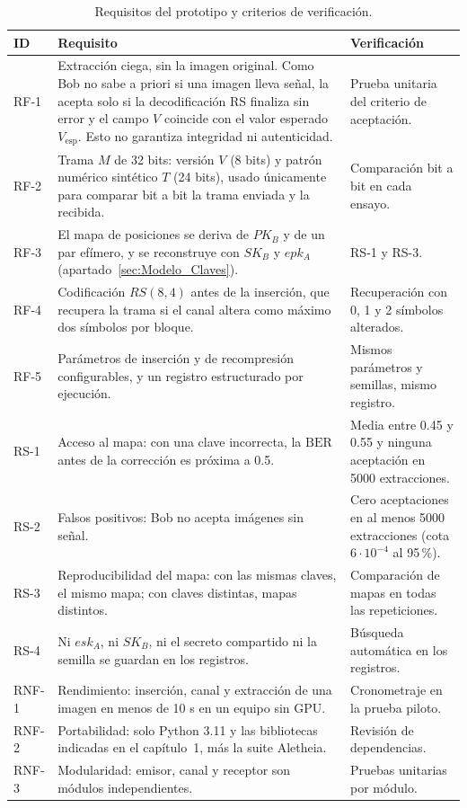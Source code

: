 \documentclass[IB]{TFUOC}%
\begin{document}
\begin{table}[H]
\centering
\scriptsize
\caption{Requisitos del prototipo y criterios de verificación.}
\label{tab:requisitos}
\begin{tabular}{|p{1.1cm}|p{7.2cm}|p{6.2cm}|}
\hline
\rowcolor{uocnavy}
\color{white}\textbf{ID} &
\color{white}\textbf{Requisito} &
\color{white}\textbf{Verificación} \\
\hline
RF-1 & Extracción ciega, sin la imagen original. Como Bob no sabe a priori si una imagen lleva señal, la acepta solo si la decodificación RS finaliza sin error y el campo $V$ coincide con el valor esperado $V_{\mathrm{esp}}$. Esto no garantiza integridad ni autenticidad. & Prueba unitaria del criterio de aceptación. \\
\hline
RF-2 & Trama $M$ de 32 bits: versión $V$ (8 bits) y patrón numérico sintético $T$ (24 bits), usado únicamente para comparar bit a bit la trama enviada y la recibida. & Comparación bit a bit en cada ensayo. \\
\hline
RF-3 & El mapa de posiciones se deriva de $PK_B$ y de un par efímero, y se reconstruye con $SK_B$ y $epk_A$ (apartado~\ref{sec:Modelo_Claves}). & RS-1 y RS-3. \\
\hline
RF-4 & Codificación $RS(8,4)$ antes de la inserción, que recupera la trama si el canal altera como máximo dos símbolos por bloque. & Recuperación con 0, 1 y 2 símbolos alterados. \\
\hline
RF-5 & Parámetros de inserción y de recompresión configurables, y un registro estructurado por ejecución. & Mismos parámetros y semillas, mismo registro. \\
\hline
RS-1 & Acceso al mapa: con una clave incorrecta, la $\mathrm{BER}$ antes de la corrección es próxima a 0.5. & Media entre 0.45 y 0.55 y ninguna aceptación en 5000 extracciones. \\
\hline
RS-2 & Falsos positivos: Bob no acepta imágenes sin señal. & Cero aceptaciones en al menos 5000 extracciones (cota $6\cdot10^{-4}$ al 95\,\%). \\
\hline
RS-3 & Reproducibilidad del mapa: con las mismas claves, el mismo mapa; con claves distintas, mapas distintos. & Comparación de mapas en todas las repeticiones. \\
\hline
RS-4 & Ni $esk_A$, ni $SK_B$, ni el secreto compartido ni la semilla se guardan en los registros. & Búsqueda automática en los registros. \\
\hline
RNF-1 & Rendimiento: inserción, canal y extracción de una imagen en menos de 10 s en un equipo sin GPU. & Cronometraje en la prueba piloto. \\
\hline
RNF-2 & Portabilidad: solo Python 3.11 y las bibliotecas indicadas en el capítulo~1, más la suite Aletheia. & Revisión de dependencias. \\
\hline
RNF-3 & Modularidad: emisor, canal y receptor son módulos independientes. & Pruebas unitarias por módulo. \\
\hline
\end{tabular}
\end{table}
\end{document}
